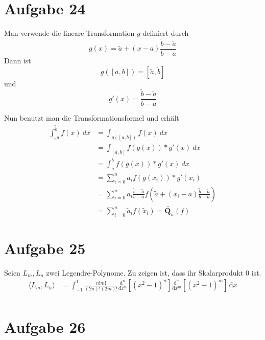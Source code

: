 \documentclass[10pt,a4paper]{article}
\begin{document}
\section{Aufgabe 24}

Man verwende die lineare Transformation $g$ definiert durch
\begin{equation}
  g(x) = \tilde{a} + (x - a)\frac{\tilde{b} - \tilde{a}}{b - a}
\end{equation}
Dann ist
\begin{equation}
  g([a, b]) = [\tilde{a}, \tilde{b}]
\end{equation}
und
\begin{equation}
  g'(x) = \frac{\tilde{b} - \tilde{a}}{b - a}
\end{equation}

Nun benutzt man die Transformationsformel und erhält
\begin{align*}
  \int_{\tilde_{a}}^{\tilde{b}} f(x)\ dx & = \int_{g([a, b])} f(x)\ dx\\
  & = \int_{[a, b]} f(g(x)) * g'(x)\ dx\\
  & = \int_{a}^{b} f(g(x)) * g'(x)\ dx\\
  & = \sum_{i = 0}^{n} a_{i} f(g(x_{i})) * g'(x_{i})\\
  & = \sum_{i = 0}^{n} a_{i}\frac{\tilde{b} - \tilde{a}}{b - a} f\left(\tilde{a} + (x_{i} - a)\frac{\tilde{b} - \tilde{a}}{b - a}\right)\\
  & = \sum_{i = 0}^{n} \tilde{a}_{i} f(\tilde{x}_{i}) = \tilde{\mathbf{Q}_{n}}(f)
\end{align*}

\section{Aufgabe 25}

Seien $L_{m}, L_{n}$ zwei Legendre-Polynome.
Zu zeigen ist, dass ihr Skalarprodukt $0$ ist.
\begin{align*}
  \langle L_{m}, L_{n} \rangle & = \int_{-1}^{1} \frac{n!m!}{(2n)!(2m)!}\frac{\mathrm{d^{n}}}{\mathrm{d}x^{n}}\left[ (x^{2} - 1)^{n} \right] \frac{\mathrm{d^{m}}}{\mathrm{d}x^{m}}\left[ (x^{2} - 1)^{m} \right]\,\mathrm{d}x\\
\end{align*}

\section{Aufgabe 26}
\end{document}
